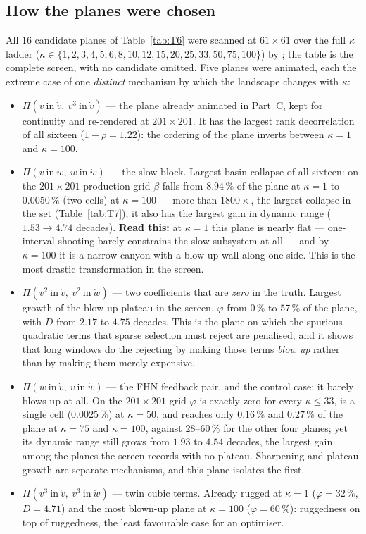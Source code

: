 \documentclass[10pt]{article}
\newcommand{\pathtt}[1]{\texttt{\path{#1}}}
\begin{document}
\subsection{How the planes were chosen}
All $16$ candidate planes of Table~\ref{tab:T6} were scanned at $61\times61$ over the full $\kappa$
ladder ($\kappa\in\{1,2,3,4,5,6,8,10,12,15,20,25,33,50,75,100\}$) by
\pathtt{analysis/12_landscape_planes.jl}; the table is the complete screen, with no candidate omitted.
Five planes were animated, each the extreme case of one \emph{distinct} mechanism by which the
landscape changes with $\kappa$:
\begin{itemize}[leftmargin=1.4em, itemsep=1pt]
\item $\Pi(v\ \text{in}\ \dot v,\ v^3\ \text{in}\ \dot v)$ --- the plane already animated in Part~C, kept for
continuity and re-rendered at $201\times201$. It has the largest rank decorrelation of all sixteen
($1-\rho=1.22$): the ordering of the plane inverts between $\kappa=1$ and $\kappa=100$.
\item $\Pi(v\ \text{in}\ \dot w,\ w\ \text{in}\ \dot w)$ --- the slow block. Largest basin collapse of all
sixteen: on the $201\times201$ production grid $\beta$ falls from $8.94\,\%$ of the plane at $\kappa=1$ to $0.0050\,\%$ (two cells) at $\kappa=100$ --- more than $1800\times$, the largest collapse in the set (Table~\ref{tab:T7}); it also has the largest gain in dynamic range ($1.53\to4.74$ decades).
\textbf{Read this:} at $\kappa=1$ this plane is nearly flat --- one-interval shooting barely constrains
the slow subsystem at all --- and by $\kappa=100$ it is a narrow canyon with a blow-up wall along one
side. This is the most drastic transformation in the screen.
\item $\Pi(v^2\ \text{in}\ \dot v,\ v^2\ \text{in}\ \dot w)$ --- two coefficients that are \emph{zero} in the
truth. Largest growth of the blow-up plateau in the screen, $\varphi$ from $0\,\%$ to $57\,\%$ of the
plane, with $D$ from $2.17$ to $4.75$ decades. This is the plane on which the spurious quadratic terms
that sparse selection must reject are penalised, and it shows that long windows do the rejecting by
making those terms \emph{blow up} rather than by making them merely expensive.
\item $\Pi(w\ \text{in}\ \dot v,\ v\ \text{in}\ \dot w)$ --- the FHN feedback pair, and the control case:
it barely blows up at all. On the $201\times201$ grid $\varphi$ is exactly zero for every $\kappa\le33$, is a single cell ($0.0025\,\%$) at $\kappa=50$, and reaches only $0.16\,\%$ and $0.27\,\%$ of the plane at $\kappa=75$ and $\kappa=100$, against $28$--$60\,\%$
for the other four planes; yet its dynamic range still grows from $1.93$ to $4.54$ decades, the largest
gain among the planes the screen records with no plateau. Sharpening and plateau growth are separate
mechanisms, and this plane isolates the first.
\item $\Pi(v^3\ \text{in}\ \dot v,\ v^3\ \text{in}\ \dot w)$ --- twin cubic terms. Already rugged at
$\kappa=1$ ($\varphi=32\,\%$, $D=4.71$) and the most blown-up plane at $\kappa=100$ ($\varphi=60\,\%$):
ruggedness on top of ruggedness, the least favourable case for an optimiser.
\end{itemize}
\end{document}
